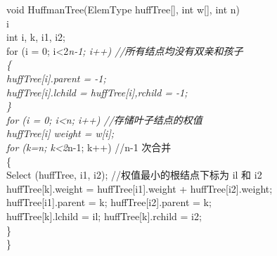 \documentclass[10pt]{article}
\begin{document}
void HuffmanTree(ElemType huffTree[], int w[], int n)\\
i\\
int i, k, i1, i2;\\
for (i = 0; i<2\textit{n-1; i++) //所有结点均没有双亲和孩子\\
\{\\[0pt]
huffTree[i].parent = -1;\\[0pt]
huffTree[i].lchild = huffTree[i],rchild = -1;\\
\}\\
for (i = 0; i<n; i++) //存储叶子结点的权值\\[0pt]
huffTree[i] weight = w[i];\\
for (k=n; k<2}n-1; k++) //n-1 次合并\\
\{\\
Select (huffTree, i1, i2); //权值最小的根结点下标为 il 和 i2\\[0pt]
huffTree[k].weight = huffTree[i1].weight + huffTree[i2].weight;\\[0pt]
huffTree[i1].parent = k; huffTree[i2].parent = k;\\[0pt]
huffTree[k].lchild = il; huffTree[k].rchild = i2;\\
\}\\
\}
\end{document}
